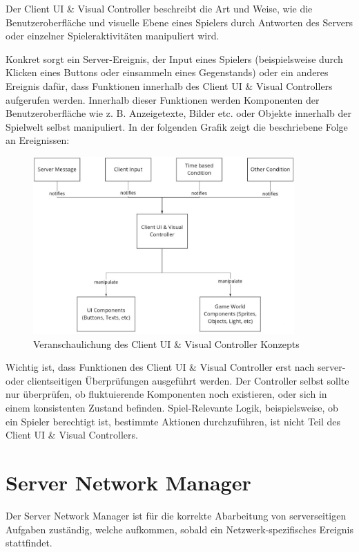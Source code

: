 Der Client UI \& Visual Controller beschreibt die Art und Weise, wie die Benutzeroberfläche und visuelle Ebene eines Spielers durch Antworten des Servers oder einzelner Spieleraktivitäten manipuliert wird.

Konkret sorgt ein Server-Ereignis, der Input eines Spielers (beispielsweise durch Klicken eines Buttons oder einsammeln eines Gegenstands) oder ein anderes Ereignis dafür, dass Funktionen innerhalb des Client UI \& Visual Controllers aufgerufen werden. Innerhalb dieser Funktionen werden Komponenten der Benutzeroberfläche wie z. B. Anzeigetexte, Bilder etc. oder Objekte innerhalb der Spielwelt selbst manipuliert. In der folgenden Grafik zeigt die beschriebene Folge an Ereignissen:

\begin{figure}[H]
	\centering
	\includegraphics[width=100mm]{images/Client_UI_und_Visual_Konzept.jpg}
	\caption[Client UI \& Visual Controller Diagramm]{Veranschaulichung des Client UI \& Visual Controller Konzepts}
	\label{pic:Client_UI_und_Visual_Konzept}
\end{figure}

Wichtig ist, dass Funktionen des Client UI \& Visual Controller erst nach server- oder clientseitigen Überprüfungen ausgeführt werden. Der Controller selbst sollte nur überprüfen, ob fluktuierende Komponenten noch existieren, oder sich in einem konsistenten Zustand befinden. Spiel-Relevante Logik, beispielsweise, ob ein Spieler berechtigt ist, bestimmte Aktionen durchzuführen, ist nicht Teil des Client UI \& Visual Controllers.

\section{Server Network Manager}

Der Server Network Manager ist für die korrekte Abarbeitung von serverseitigen Aufgaben zuständig, welche aufkommen, sobald ein Netzwerk-spezifisches Ereignis stattfindet.

